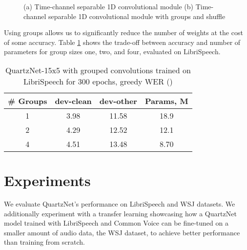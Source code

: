 \documentclass{article}
\begin{document}
\begin{figure}[h]
 \centering
 \caption{(a) Time-channel separable 1D convolutional module (b) Time-channel separable 1D convolutional module with groups and shuffle}
 \label{fig:quartz_arch_groups}
\end{figure}

Using groups allows us to significantly reduce the number of weights at the cost of some accuracy. Table \ref{tab:GroupConv} shows the trade-off between accuracy and number of parameters for group sizes one, two, and four, evaluated on LibriSpeech. 

\begin{table}[thb]
\centering
\caption{QuartzNet-15x5 with grouped convolutions trained on LibriSpeech for 300 epochs, greedy WER ()}
\vspace{4pt}
\label{tab:GroupConv}
\begin{tabular}{c c c c} 
 \hline
 {\textbf{\# Groups}} & {\textbf{dev-clean}} & {\textbf{dev-other}} & {\textbf{Params, M}} \\
 \hline
 1  & 3.98 & 11.58 & 18.9 \\ 
 2  & 4.29 & 12.52 & 12.1 \\ 
 4  & 4.51 & 13.48 & 8.70 \\ 
 \hline
\end{tabular}
\end{table}

\iffalse{
\subsection{QuartzNet with attention-based RNN decoder - WIP}
We used QuartzNet with CTC loss, but the QuartzNet encoder can be used also with different decoders. For example we combined QuartzNet with attention-based RNN decoder (\ref{fig:quartz_arnn}:

\begin{figure}[thb]
 \centering
 \scalebox{1.0}{
 \texttt{[image: quartznet-arnn.png]}
 }
 \caption{QuartzNet-ARNN: QuartzNet-based encoder + Attention based RNN decoder}
 \label{fig:quartz_arnn}
\end{figure}
}\fi

\section{Experiments}
We  evaluate QuartzNet's performance on LibriSpeech and WSJ datasets. We additionally experiment with  a transfer learning showcasing how a QuartzNet model trained with LibriSpeech and Common Voice \cite{CommonVoice} can be fine-tuned on a smaller amount of audio data, the WSJ dataset, to achieve better performance than training from scratch.
\end{document}
